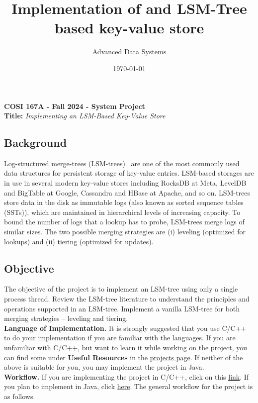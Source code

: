 \documentclass[12pt,a4paper,twoside]{article}
\title{Implementation of and LSM-Tree based key-value store}
\author{Advanced Data Systems}
\date{\today}
\begin{document}
\begin{center}
    {\textbf{COSI 167A - Fall 2024 - System Project}}\\
    {\textbf{Title: }\textit{Implementing an LSM-Based Key-Value Store}}
\end{center}


\normalsize
\subsection*{Background}
Log-structured merge-trees (LSM-trees)~\cite{CLMJLSM2020, NDMASIMONKEY2017, POECDGEJLSM1996} are one of the most commonly used data structures for persistent storage of key-value entries.
LSM-based storages are in use in several modern key-value stores including RocksDB at Meta, LevelDB and BigTable at Google, Cassandra and HBase at Apache, and so on.
LSM-trees store data in the disk as immutable logs (also known as sorted sequence tables (SSTs)), which are maintained in hierarchical levels of increasing capacity.
To bound the number of logs that a lookup has to probe, LSM-trees merge logs of similar sizes.
The two possible merging strategies are (i) leveling (optimized for lookups) and (ii) tiering (optimized for updates).

\subsection*{Objective}
The objective of the project is to implement an LSM-tree using only a single process thread. 
Review the LSM-tree literature to understand the principles and operations supported in an LSM-tree.
Implement a vanilla LSM-tree for both merging strategies -- leveling and tiering. \\

\noindent \textbf{Language of Implementation.} It is strongly suggested that you use C/C++ to do your implementation if you are familiar with the languages. 
If you are unfamiliar with C/C++, but want to learn it while working on the project, you can find some under \textbf{Useful Resources} in the \href{https://ssd-brandeis.github.io/COSI-167A/assignments/}{\underline{projects page}}. 
If neither of the above is suitable for you, you may implement the project in Java. \\ 

\noindent \textbf{Workflow.} If you are implementing the project in C/C++, click on this \href{https://github.com/SSD-Brandeis/LSMTree-DataStore-CPP}{\underline{link}}. 
If you plan to implement in Java, click \href{https://github.com/SSD-Brandeis/LSMTree-DataStore-Java}{\underline{here}}. 
The general workflow for the project is as follows.
\end{document}
